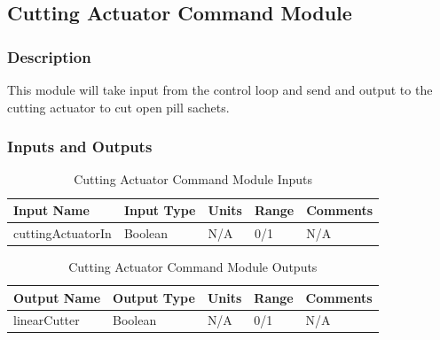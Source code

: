 \documentclass[12pt,titlepage]{article}
\begin{document}

\subsection{Cutting Actuator Command Module }
\subsubsection*{Description}
This module will take input from the control loop and send and output to the cutting actuator to cut open pill sachets.
\subsubsection*{Inputs and Outputs}
 
\begin{table}[ht!]
\begin{center}
\begin{adjustbox}{max width=\textwidth}
\small
\begin{tabular}{|p{}|p{}|p{}|p{}|p{}|}
 \hline
 \textbf{Input Name} & \textbf{Input Type} & \textbf{Units} &\textbf{Range} & \textbf{Comments} \\
 \hline 
 cuttingActuatorIn & Boolean  & N/A & 0/1 & N/A \\
 \hline
\end{tabular}
\end{adjustbox}
\end{center}
\caption{Cutting Actuator Command Module Inputs}
\end{table}

\begin{table}[ht!]
\begin{center}
\begin{adjustbox}{max width=\textwidth}
\small
\begin{tabular}{|p{}|p{}|p{}|p{}|p{}|}
 \hline
 \textbf{Output Name} & \textbf{Output Type} & \textbf{Units} &\textbf{Range} & \textbf{Comments} \\
 \hline 
 linearCutter & Boolean & N/A & 0/1 & N/A \\
 \hline
\end{tabular}
\end{adjustbox}
\end{center}
\caption{Cutting Actuator Command Module Outputs}
\end{table}
\end{document}

